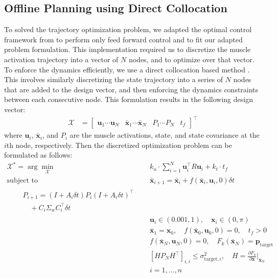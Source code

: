 \documentclass[letterpaper, 10pt, conference]{ieeeconf}
\begin{document}
\subsection{Offline Planning using Direct Collocation}
To solved the trajectory optimization problem, we adapted the optimal control framework from \cite{stochastic_model} to perform only feed forward control and to fit our adapted problem formulation. This implementation required us to discretize the muscle activation trajectory into a vector of $N$ nodes, and to optimize over that vector. To enforce the dynamics efficiently, we use a direct collocation based method \cite{direct_collocation}. This involves similarly discretizing the state trajectory into a series of $N$ nodes that are added to the design vector, and then enforcing the dynamics constraints between each consecutive node. This formulation results in the following design vector:
\begin{align}
    \mathcal{X} &= \begin{bmatrix}
        \mathbf{u}_1  \cdots \mathbf{u}_N & \mathbf{\bar{x}}_1 \cdots \mathbf{\bar{x}}_N & P_1 \cdots P_N & t_f
    \end{bmatrix}^\top
\end{align}
where $\mathbf{u}_i$, $\mathbf{\bar{x}}_i$, and $P_i$ are the muscle activations, state, and state covariance at the $i$th node, respectively. Then the discretized optimization problem can be formulated as follows:
\begin{align}
    \mathcal{X}^* = \arg\min_{\mathcal{X}} &\quad k_u \cdot \sum_{i=1}^{N} \mathbf{u}_i^\top R \mathbf{u}_i + k_t \cdot t_f \label{eq:dcost} \\
    \text{subject to} &\quad \mathbf{\bar{x}}_{i+1} = \mathbf{\bar{x}}_i + f(\mathbf{\bar{x}}_i, \mathbf{u}_i, 0) \delta t \\
    \begin{split}
        &\quad P_{i+1} = (I + A_i \delta t)P_i(I + A_i \delta t)^\top \\
        &\quad \quad + C_i \Sigma_w C_i^\top \delta t
    \end{split} \label{test} \\
    &\quad \mathbf{u}_i \in (0.001, 1), \quad \mathbf{x}_i \in (0, \pi) \\
    &\quad \mathbf{\bar{x}}_1 = \mathbf{x}_0, \quad f(\mathbf{\bar{x}}_0, \mathbf{u}_0, 0) = 0, \quad t_f > 0 \\
    &\quad f(\mathbf{\bar{x}}_N, \mathbf{u}_N, 0) = 0, \quad F_k(\mathbf{\bar{x}}_N) = \mathbf{p}_{\text{target}} \label{eq:dtarget_constraint} \\
    &\quad [HP_NH^\top]_{i,i} \leq \sigma_{\text{target}, i}^2, \quad H = \frac{\partial F_k}{\partial \mathbf{x}}\bigg|_{\mathbf{\bar{x}}_N} \\
    &\quad i = 1, \ldots, n \label{eq:dtarget_variance_constraint}
\end{align}
\end{document}
